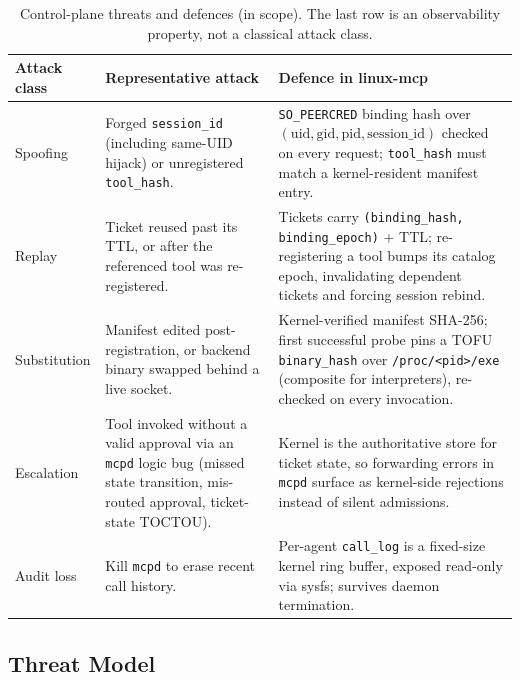 \begin{table}[t]
\centering
\caption{Control-plane threats and defences (in scope). The last row is an observability property, not a classical attack class.}
\label{tab:threat_in_scope}
\footnotesize
\setlength{\tabcolsep}{5pt}\renewcommand{\arraystretch}{1.15}
\begin{tabularx}{\linewidth}{@{}l X X@{}}
\toprule
\textbf{Attack class} & \textbf{Representative attack} & \textbf{Defence in linux-mcp} \\
\midrule

Spoofing
& Forged \texttt{session\_id} (including same-UID hijack) or unregistered \texttt{tool\_hash}.
& \texttt{SO\_PEERCRED} binding hash over $(\text{uid},\text{gid},\text{pid},\text{session\_id})$ checked on every request; \texttt{tool\_hash} must match a kernel-resident manifest entry. \\

Replay
& Ticket reused past its TTL, or after the referenced tool was re-registered.
& Tickets carry \texttt{(binding\_hash, binding\_epoch)} + TTL; re-registering a tool bumps its catalog epoch, invalidating dependent tickets and forcing session rebind. \\

Substitution
& Manifest edited post-registration, or backend binary swapped behind a live socket.
& Kernel-verified manifest SHA-256; first successful probe pins a TOFU \texttt{binary\_hash} over \texttt{/proc/<pid>/exe} (composite for interpreters), re-checked on every invocation. \\

Escalation
& Tool invoked without a valid approval via an \texttt{mcpd} logic bug (missed state transition, mis-routed approval, ticket-state TOCTOU).
& Kernel is the authoritative store for ticket state, so forwarding errors in \texttt{mcpd} surface as kernel-side rejections instead of silent admissions. \\

Audit loss
& Kill \texttt{mcpd} to erase recent call history.
& Per-agent \texttt{call\_log} is a fixed-size kernel ring buffer, exposed read-only via sysfs; survives daemon termination. \\

\bottomrule
\end{tabularx}
\end{table}


\subsection{Threat Model}
\label{sec:threat-model}

